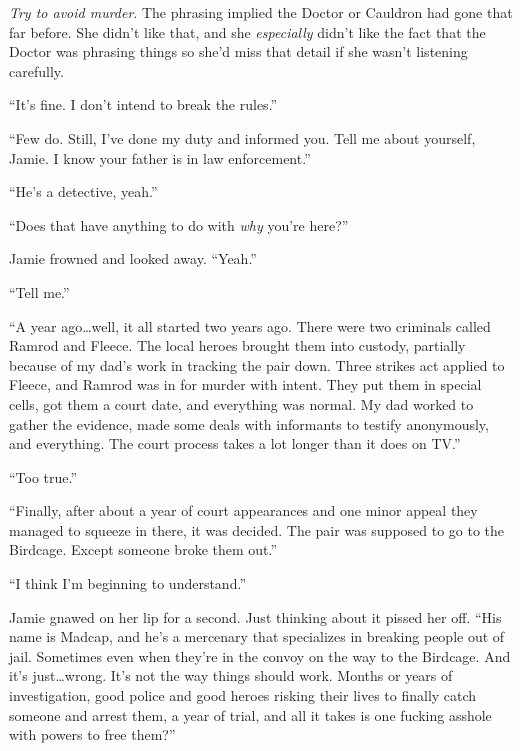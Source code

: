 \emph{Try to avoid murder}.  The phrasing implied the Doctor or Cauldron had gone that far before. She didn't like that, and she \emph{especially} didn't like the fact that the Doctor was phrasing things so she'd miss that detail if she wasn't listening carefully.



``It's fine.  I don't intend to break the rules.''



``Few do.  Still, I've done my duty and informed you.  Tell me about yourself, Jamie.  I know your father is in law enforcement.''



``He's a detective, yeah.''



``Does that have anything to do with \emph{why} you're here?''



Jamie frowned and looked away.  ``Yeah.''



``Tell me.''



``A year ago\ldots well, it all started two years ago.  There were two criminals called Ramrod and Fleece.  The local heroes brought them into custody, partially because of my dad's work in tracking the pair down.  Three strikes act applied to Fleece, and Ramrod was in for murder with intent.  They put them in special cells, got them a court date, and everything was normal.  My dad worked to gather the evidence, made some deals with informants to testify anonymously, and everything.  The court process takes a lot longer than it does on TV.''



``Too true.''



``Finally, after about a year of court appearances and one minor appeal they managed to squeeze in there, it was decided.  The pair was supposed to go to the Birdcage.  Except someone broke them out.''



``I think I'm beginning to understand.''



Jamie gnawed on her lip for a second.  Just thinking about it pissed her off.  ``His name is Madcap, and he's a mercenary that specializes in breaking people out of jail.  Sometimes even when they're in the convoy on the way to the Birdcage.  And it's just\ldots wrong.  It's not the way things should work.  Months or years of investigation, good police and good heroes risking their lives to finally catch someone and arrest them, a year of trial, and all it takes is one fucking asshole with powers to free them?''




